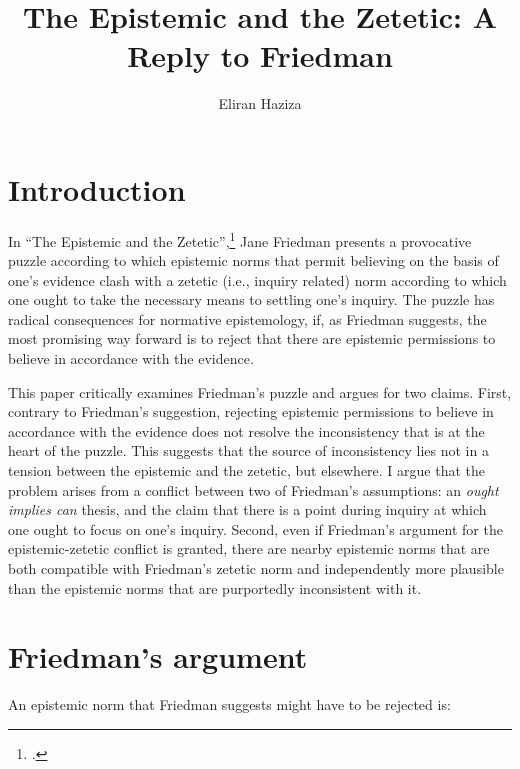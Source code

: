 \documentclass[12pt]{article}
\title{The Epistemic and the Zetetic: A Reply to Friedman}
\author{Eliran Haziza}
\begin{document}
\maketitle

\section{Introduction}

In ``The Epistemic and the Zetetic'',\footnote{\textcite{friedman_epistemic_nodate}.} Jane Friedman presents a provocative puzzle according to which epistemic norms that permit believing on the basis of one's evidence clash with a zetetic (i.e., inquiry related) norm according to which one ought to take the necessary means to settling one's inquiry. The puzzle has radical consequences for normative epistemology, if, as Friedman suggests, the most promising way forward is to reject that there are epistemic permissions to believe in accordance with the evidence.

This paper critically examines Friedman's puzzle and argues for two claims. First, contrary to Friedman's suggestion, rejecting epistemic permissions to believe in accordance with the evidence does not resolve the inconsistency that is at the heart of the puzzle. This suggests that the source of inconsistency lies not in a tension between the epistemic and the zetetic, but elsewhere. I argue that the problem arises from a conflict between two of Friedman's assumptions: an \textit{ought implies can} thesis, and the claim that there is a point during inquiry at which one ought to focus on one's inquiry. Second, even if Friedman's argument for the epistemic-zetetic conflict is granted, there are nearby epistemic norms that are both compatible with Friedman's zetetic norm and independently more plausible than the epistemic norms that are purportedly inconsistent with it.

\section{Friedman's argument}\label{sec:2}

An epistemic norm that Friedman suggests might have to be rejected is:
\end{document}

